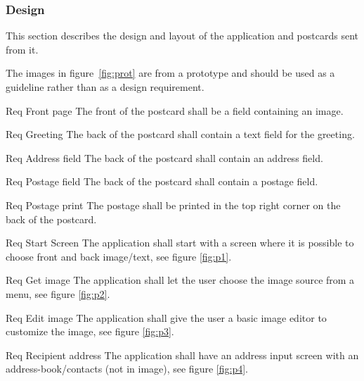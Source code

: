 \documentclass[10pt,a4paper]{article}
\begin{document}
\subsubsection{Design}
This section describes the design and layout of the application and postcards sent from it. 

The images in figure~\ref{fig:prot} are from a prototype and should be used as a guideline rather than as a design requirement.

\begin {description}
	\item [Req \thesubsubsection {.\thedesign} Front page] The front of the postcard shall be a field containing an image.
	\item [Req \thesubsubsection {.\thedesign} Greeting] The back of the postcard shall contain a text field for the greeting.
	\item [Req \thesubsubsection {.\thedesign} Address field] The back of the postcard shall contain an address field.
	\item [Req \thesubsubsection {.\thedesign} Postage field] The back of the postcard shall contain a postage field. 
	\item [Req \thesubsubsection {.\thedesign} Postage print] The postage shall be printed in the top right corner on the back of the postcard. 
	\item [Req \thesubsubsection {.\thedesign} Start Screen] The application shall start with a screen where it is possible to choose front and back image/text, see figure \ref{fig:p1}.
	\item [Req \thesubsubsection {.\thedesign} Get image] The application shall let the user choose the image source from a menu, see figure \ref{fig:p2}.
	\item [Req \thesubsubsection {.\thedesign} Edit image] The application shall give the user a basic image editor to customize the image, see figure \ref{fig:p3}.
	\item [Req \thesubsubsection {.\thedesign} Recipient address] The application shall have an address input screen with an address-book/contacts (not in image), see figure \ref{fig:p4}.
\end{description}
\end{document}

